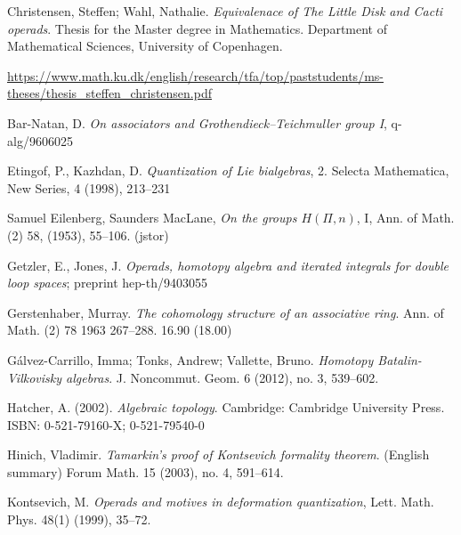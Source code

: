 \documentclass[TFM.tex]{subfiles}
\begin{document}
%


\begin{thebibliography}{}


 Christensen, Steffen; Wahl, Nathalie. \emph{Equivalenace of The Little Disk and
Cacti operads}. Thesis for the Master degree in Mathematics. Department of Mathematical Sciences, University of Copenhagen.

 \url{https://www.math.ku.dk/english/research/tfa/top/paststudents/ms-theses/thesis_steffen_christensen.pdf}


 Bar-Natan, D. \emph{On associators and Grothendieck–Teichmuller group I}, q-alg/9606025


  Etingof, P., Kazhdan, D. \emph{Quantization of Lie bialgebras}, 2. Selecta Mathematica, New
Series, 4 (1998), 213–231


 Samuel Eilenberg, Saunders MacLane, \emph{On the groups $H(Π,n)$}, I, Ann. of Math. (2) 58, (1953), 55–106. (jstor) %


 Getzler, E., Jones, J. \emph{Operads, homotopy algebra and iterated integrals for double loop
spaces}; preprint hep-th/9403055


 Gerstenhaber, Murray. \emph{The cohomology structure of an associative ring}. 
Ann. of Math. (2) 78 1963 267–288. 
16.90 (18.00)  %


  Gálvez-Carrillo, Imma; Tonks, Andrew; Vallette, Bruno. \emph{Homotopy Batalin-Vilkovisky algebras}. J. Noncommut. Geom. 6 (2012), no. 3, 539–602.


 Hatcher, A. (2002). \emph{Algebraic topology}. Cambridge: Cambridge University Press. ISBN: 0-521-79160-X; 0-521-79540-0 


 Hinich, Vladimir. \emph{Tamarkin's proof of Kontsevich formality theorem}. (English summary) 
Forum Math. 15 (2003), no. 4, 591–614. 


 Kontsevich, M. \emph{Operads and motives in deformation quantization}, Lett. Math. Phys.
48(1) (1999), 35–72.



\end{thebibliography}
\end{document}
